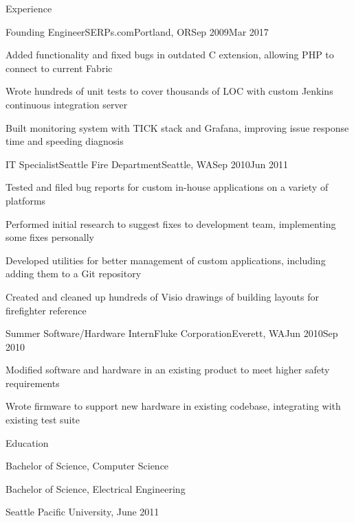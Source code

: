 \documentclass[letterpaper,12pt]{article}
\begin{document}
\begin{paracol}{2}
\begin{res_section}{Experience}
\begin{res_experienceitem}{Founding Engineer}{SERPs.com}{Portland, OR}{Sep 2009}{Mar 2017}
  \item Added functionality and fixed bugs in outdated C extension, allowing PHP to connect to current Fabric
  \item Wrote hundreds of unit tests to cover thousands of LOC with custom Jenkins continuous integration server
  \item Built monitoring system with TICK stack and Grafana, improving issue response time and speeding diagnosis
\end{res_experienceitem}
\begin{res_experienceitem}{IT Specialist}{Seattle Fire Department}{Seattle, WA}{Sep 2010}{Jun 2011}
  \item Tested and filed bug reports for custom in-house applications on a variety of platforms
  \item Performed initial research to suggest fixes to development team, implementing some fixes personally
  \item Developed utilities for better management of custom applications, including adding them to a Git repository
  \item Created and cleaned up hundreds of Visio drawings of building layouts for firefighter reference
\end{res_experienceitem}
\begin{res_experienceitem}{Summer Software/Hardware Intern}{Fluke Corporation}{Everett, WA}{Jun 2010}{Sep 2010}
  \item Modified software and hardware in an existing product to meet higher safety requirements
  \item Wrote firmware to support new hardware in existing codebase, integrating with existing test suite
\end{res_experienceitem}
\end{res_section}

\begin{res_section}{Education}
\begin{res_content}{Bachelor of Science, Computer Science

  \noindent Bachelor of Science, Electrical Engineering

  \textnormal{
      \sffamily
      \normalsize
      \hfill
      Seattle Pacific University, June 2011}
}
\end{res_content}
\end{res_section}


\end{paracol}
\end{document}

